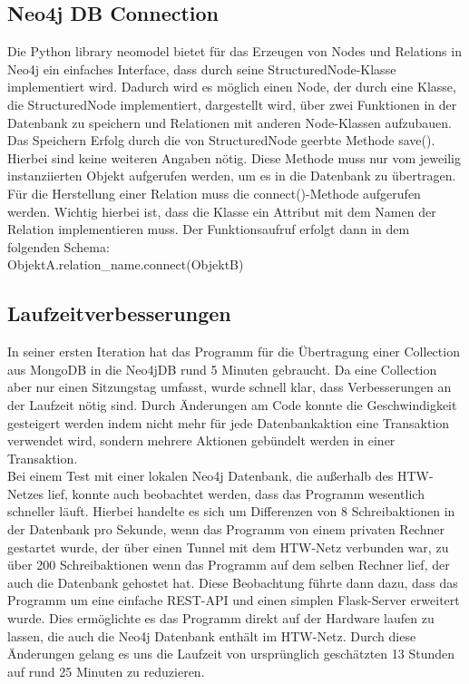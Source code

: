 \subsection{Neo4j DB Connection}
Die Python library neomodel bietet für das Erzeugen von Nodes und Relations in Neo4j ein einfaches Interface, dass durch seine StructuredNode-Klasse implementiert wird. Dadurch wird es möglich einen Node, der durch eine Klasse, die StructuredNode implementiert, dargestellt wird, über zwei Funktionen in der Datenbank zu speichern und Relationen mit anderen Node-Klassen aufzubauen.\\
Das Speichern Erfolg durch die von StructuredNode geerbte Methode save(). Hierbei sind keine weiteren Angaben nötig. Diese Methode muss nur vom jeweilig instanziierten Objekt aufgerufen werden, um es in die Datenbank zu übertragen. Für die Herstellung einer Relation muss die connect()-Methode aufgerufen werden. Wichtig hierbei ist, dass die Klasse ein Attribut mit dem Namen der Relation implementieren muss. Der Funktionsaufruf erfolgt dann in dem folgenden Schema:\\
\newcommand\tab[1][1cm]{\hspace*{#1}}
\tab ObjektA.relation\_name.connect(ObjektB)
\subsection{Laufzeitverbesserungen}
In seiner ersten Iteration hat das Programm für die Übertragung einer Collection aus MongoDB in die Neo4jDB rund 5 Minuten gebraucht. Da eine Collection aber nur einen Sitzungstag umfasst, wurde schnell klar, dass Verbesserungen an der Laufzeit nötig sind. Durch Änderungen am Code konnte die Geschwindigkeit gesteigert werden indem nicht mehr für jede Datenbankaktion eine Transaktion verwendet wird, sondern mehrere Aktionen gebündelt werden in einer Transaktion.\\
Bei einem Test mit einer lokalen Neo4j Datenbank, die außerhalb des HTW-Netzes lief, konnte auch beobachtet werden, dass das Programm wesentlich schneller läuft. Hierbei handelte es sich um Differenzen von 8 Schreibaktionen in der Datenbank pro Sekunde, wenn das Programm von einem privaten Rechner gestartet wurde, der über einen Tunnel mit dem HTW-Netz verbunden war, zu über 200 Schreibaktionen wenn das Programm auf dem selben Rechner lief, der auch die Datenbank gehostet hat. Diese Beobachtung führte dann dazu, dass das Programm um eine einfache REST-API und einen simplen Flask-Server erweitert wurde. Dies ermöglichte es das Programm direkt auf der Hardware laufen zu lassen, die auch die Neo4j Datenbank enthält im HTW-Netz. Durch diese Änderungen gelang es uns die Laufzeit von ursprünglich geschätzten 13 Stunden auf rund 25 Minuten zu reduzieren.
